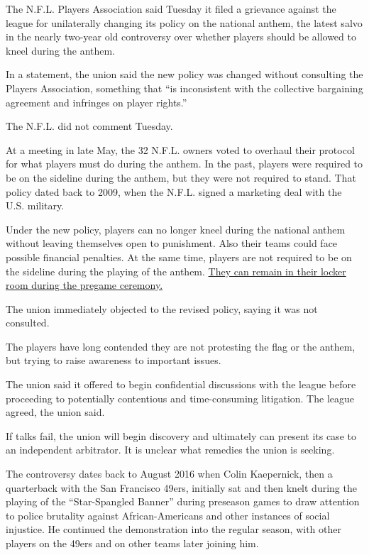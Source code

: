 The N.F.L. Players Association said Tuesday it filed a grievance against
the league for unilaterally changing its policy on the national anthem,
the latest salvo in the nearly two-year old controversy over whether
players should be allowed to kneel during the anthem.

In a statement, the union said the new policy was changed without
consulting the Players Association, something that ``is inconsistent
with the collective bargaining agreement and infringes on player
rights.''

The N.F.L. did not comment Tuesday.

At a meeting in late May, the 32 N.F.L. owners voted to overhaul their
protocol for what players must do during the anthem. In the past,
players were required to be on the sideline during the anthem, but they
were not required to stand. That policy dated back to 2009, when the
N.F.L. signed a marketing deal with the U.S. military.

Under the new policy, players can no longer kneel during the national
anthem without leaving themselves open to punishment. Also their teams
could face possible financial penalties. At the same time, players are
not required to be on the sideline during the playing of the anthem.
\href{https://www.nytimes3xbfgragh.onion/2018/05/23/sports/nfl-anthem-kneeling.html}{They
can remain in their locker room during the pregame ceremony.}

The union immediately objected to the revised policy, saying it was not
consulted.

The players have long contended they are not protesting the flag or the
anthem, but trying to raise awareness to important issues.

The union said it offered to begin confidential discussions with the
league before proceeding to potentially contentious and time-consuming
litigation. The league agreed, the union said.

If talks fail, the union will begin discovery and ultimately can present
its case to an independent arbitrator. It is unclear what remedies the
union is seeking.

The controversy dates back to August 2016 when Colin Kaepernick, then a
quarterback with the San Francisco 49ers, initially sat and then knelt
during the playing of the ``Star-Spangled Banner'' during preseason
games to draw attention to police brutality against African-Americans
and other instances of social injustice. He continued the demonstration
into the regular season, with other players on the 49ers and on other
teams later joining him.

